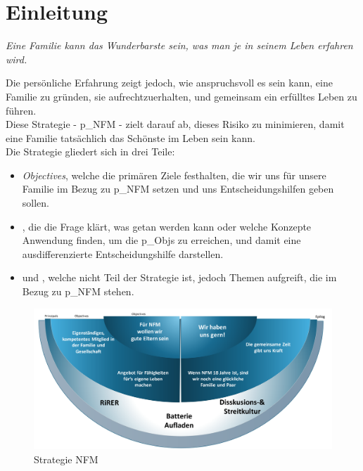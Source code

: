 \renewcommand{\abstractname}{Abstract}

\section{Einleitung}
\begin{center}
	\textit{Eine Familie kann das Wunderbarste sein, was man je in seinem Leben erfahren wird.}
\end{center}

Die persönliche Erfahrung zeigt jedoch, wie anspruchsvoll es sein kann, eine Familie zu gründen, sie aufrechtzuerhalten, und gemeinsam ein erfülltes Leben zu führen.\\


Diese Strategie - \gls{p_NFM} - zielt darauf ab, dieses Risiko zu minimieren, damit eine Familie tatsächlich das Schönste im Leben sein kann.\\


Die Strategie gliedert sich in drei Teile:
\begin{itemize}
	\item \textit{Objectives}, welche die primären Ziele festhalten, die wir uns für unsere Familie im Bezug zu \gls{p_NFM} setzen und uns Entscheidungshilfen geben sollen.
	\item \textit{}, die die Frage klärt, was getan werden kann oder welche Konzepte Anwendung finden, um die \glspl{p_Obj} zu erreichen, und damit eine ausdifferenzierte Entscheidungshilfe darstellen.
	\item und \textit{}, welche nicht Teil der Strategie ist, jedoch Themen aufgreift, die im Bezug zu \gls{p_NFM} stehen.
\end{itemize}

\begin{figure}[H]
	\centering
	\includegraphics[scale = 0.4]{attachment/chapter_OWN/Scc010.png}
	\caption{Strategie NFM}
\end{figure} 


